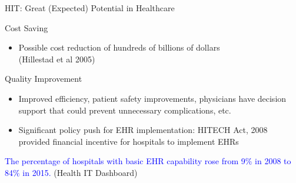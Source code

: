 \documentclass[10pt]{beamer}
\begin{document}
\begin{frame}[fragile]{HIT: Great (Expected) Potential in Healthcare}
\begin{alertblock}{Cost Saving}
\begin{itemize}
    \item Possible cost reduction of hundreds of billions of dollars \\ \scriptsize (Hillestad et al 2005)
\end{itemize}
\end{alertblock}

\begin{alertblock}{Quality Improvement}
\begin{itemize}
    \item Improved efficiency, patient safety improvements, physicians have decision support that could prevent unnecessary complications, etc.
    \item Significant policy push for EHR implementation: HITECH Act, 2008 provided financial incentive for hospitals to implement EHRs 
\end{itemize}
\end{alertblock}

\vspace{4mm}

\textcolor{blue}{The percentage of hospitals with basic EHR capability rose from 9$\%$ in 2008 to 84$\%$ in 2015.} \scriptsize (Health IT Dashboard)

\end{frame}
\end{document}
